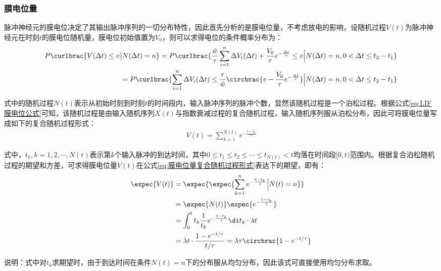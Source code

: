 \documentclass[11pt]{article}
\begin{document}
\subsubsection{膜电位量}
脉冲神经元的膜电位决定了其输出脉冲序列的一切分布特性，因此首先分析的是膜电位量，不考虑放电的影响，设随机过程$V(t)$为脉冲神经元在时刻$t$的膜电位随机量，膜电位初始值置为$V_0$，则可以求得电位的条件概率分布为：
\begin{align}
  \begin{aligned}
    P\curlbrac{V(\Delta t)\le v
    \big|  N(\Delta t)=n}  =P\curlbrac{\frac{\tilde{w}}{\tau}\sum_{i=1}^{n}\Delta V_i(\Delta t)+\frac{V_0}{\tau}e^{-\frac{\Delta t}{\tau}}\le v\Big| N(\Delta t)=n,0<\Delta t\le t_2-t_1} \\
    =P\curlbrac{\sum_{i=1}^{n}\Delta V_i(\Delta t)\le \frac{\tau}{\tilde{w}}\circbrac{v-\frac{V_0}{\tau}e^{-\frac{\Delta t}{\tau}}}\Big| N(\Delta t)=n,0<\Delta t\le t_2-t_1}
  \end{aligned} \label{eq:膜电位的条件分布概率}
\end{align}\par
式中的随机过程$N(t)$表示从初始时刻到时刻$t$的时间段内，输入脉冲序列的脉冲个数，显然该随机过程是一个泊松过程。根据公式\ref{eq:LIF膜电位公式}可知，该随机过程是由输入随机序列$X(t)$与指数衰减过程的复合随机过程，输入随机序列服从泊松分布，因此可将膜电位量写成如下的复合随机过程形式：
\begin{align}
  V(t)=\sum_{k=1}^{N(t)}e^{-\frac{t-t_k}{\tau}}
  \label{eq:膜电位量复合随机过程形式}
\end{align}\par
式中，$t_k,k=1,2,\cdots,N(t)$表示第$k$个输入脉冲的到达时间，其中$0\le t_1\le t_2\le\cdots\le t_{N(t)}<t$均落在时间段$[0,t)$范围内。根据复合泊松随机过程的期望和方差，可求得膜电位量$V(t)$在公式\ref{eq:膜电位量复合随机过程形式}表达下的期望，即有：
\begin{align}
  \begin{aligned}
    \expec{V(t)} & =\expec{\expec{\sum_{k=1}^{n}e^{-\frac{t-t_k}{\tau}}\Big|N(t)=n}}                  \\
                 & =\expec{N(t)}\expec{e^{-\frac{t-t_k}{\tau}}}                                       \\
                 & =\int_{0}^{t}t_k\frac{1}{t_k}e^{-\frac{t-t_k}{\tau}}\di t_k\cdot \lambda t         \\
                 & =\lambda t\cdot\frac{1-e^{- t/\tau}}{ t/\tau}=\lambda\tau\circbrac{1-e^{- t/\tau}}
  \end{aligned} \label{eq:膜电位量的期望}
\end{align}\par
说明：式中对$t_k$求期望时，由于到达时间在条件$N(t)=n$下的分布服从均匀分布，因此该式可直接使用均匀分布求取。
\end{document}
